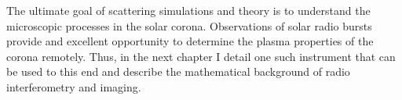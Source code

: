 The ultimate goal of scattering simulations and theory is to understand the microscopic processes in the solar corona. Observations of solar radio bursts provide and excellent opportunity to determine the plasma properties of the corona remotely. Thus, in the next chapter I detail one such instrument that can be used to this end and describe the mathematical background of radio interferometry and imaging.
%












































